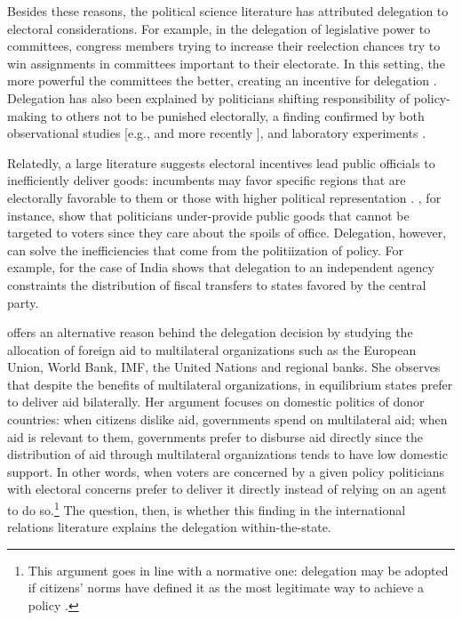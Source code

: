 \documentclass[12pt]{amsart}
\numberwithin{equation}{section}
\theoremstyle{definition}
\theoremstyle{definition}
\theoremstyle{definition}
\begin{document}

 Besides these reasons, the political science literature has attributed delegation to electoral considerations. For example, in the delegation of legislative power to committees, congress members trying to increase their reelection chances try to win assignments in committees important to their electorate. In this setting, the more powerful the committees the better, creating an incentive for delegation \citep{mccubbins_1991}. Delegation has also been explained by politicians shifting responsibility of policy-making to others not to be punished electorally, a finding confirmed by both observational studies [e.g., \citet{fiorina_1982} and more recently \citep{loftis_2014}],  and laboratory experiments \citep{bartling_fischbacher_2012}. 
 
 Relatedly, a large literature suggests electoral incentives lead public officials to inefficiently deliver goods: incumbents may favor specific regions that are electorally favorable to them \citep{schady_2000, Miguel_zaidi_2003, cole_2004, dahlberg_2002} or those with higher political representation  \citep{wright_1974, porto_2001, ansolabehere_etal_2002}. \citet{lizzeri_2001}, for instance, show that politicians under-provide public goods that cannot be targeted to voters since they care about the spoils of office. Delegation, however, can solve the inefficiencies that come from the politiization of policy. For example, for the case of India \citet{khemani_2007} shows that delegation to an independent agency constraints the distribution of fiscal transfers to states favored by the central party.  
 
 \citet{milner_2004} offers an alternative reason behind the delegation decision by studying the allocation of foreign aid to multilateral organizations such as the European Union, World Bank, IMF, the United Nations and regional banks. She observes that despite the benefits of multilateral organizations, in equilibrium states prefer to deliver aid bilaterally. Her argument focuses on domestic politics of donor countries: when citizens dislike aid, governments spend on multilateral aid; when aid is relevant to them, governments prefer to disburse aid directly since the distribution of aid through multilateral organizations tends to have low domestic support. In other words, when voters are concerned by a given policy politicians with electoral concerns prefer to deliver it directly instead of relying on an agent to do so.\footnote{This argument goes in line with a normative one: delegation may be adopted if citizens’ norms have defined it as the most legitimate way to achieve a policy \citep{finnemore_1996, ruggie_1993, milner_2011}.} The question, then, is whether this finding in the international relations literature explains the delegation within-the-state. 
 
\end{document}
